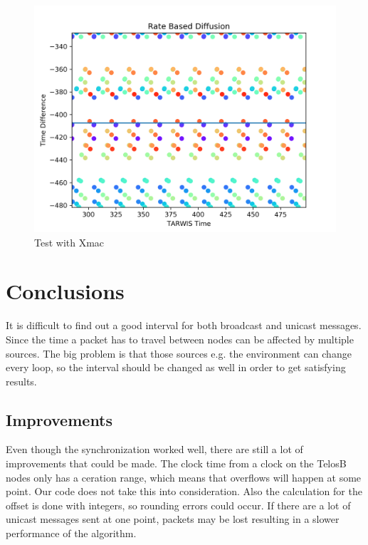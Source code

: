 \documentclass{llncs}
\begin{document}
\begin{figure}[H]
  \centering
  \includegraphics[width=\linewidth]{xmac.png}
  \caption{Test with Xmac}
  \label{fig:Test xmac}
\end{figure}

\section{Conclusions}

It is difficult to find out a good interval for both broadcast and unicast messages. Since the time a packet has to travel between nodes can be affected by multiple sources. The big problem is that those sources e.g. the environment can change every loop, so the interval should be changed as well in order to get satisfying results.

\subsection{Improvements}
Even though the synchronization worked well, there are still a lot of improvements that could be made. The clock time from a clock on the TelosB nodes only has a ceration range, which means that overflows will happen at some point. Our code does not take this into consideration. Also the calculation for the offset is done with integers, so rounding errors could occur. If there are a lot of unicast messages sent at one point, packets may be lost resulting in a slower performance of the algorithm.
\end{document}
